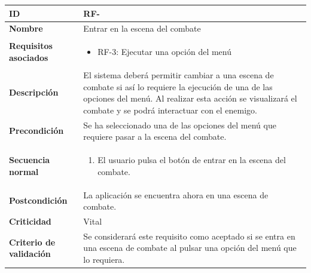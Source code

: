 \begin{center}
	\begin{tabular}{ | p{4.7cm} | p{10cm} | } 
		\hline
		
		\textbf{ID} & RF-\arabic{contador_requisitos_funcionales}
		{contador_requisitos_funcionales} \\
		
		\hline 
		\textbf{Nombre} &
		Entrar en la escena del combate\\ 
		
		\hline
		\textbf{Requisitos asociados} & 
		\begin{itemize}
			\item RF-3: Ejecutar una opción del menú
		\end{itemize}\\
		
		\hline
		\textbf{Descripción} & 
		El sistema deberá permitir cambiar a una escena de combate si así lo requiere la ejecución de una de las opciones del menú. Al realizar esta acción se visualizará el combate y se podrá interactuar con el enemigo.\\
		
		\hline
		\textbf{Precondición} & 
		Se ha seleccionado una de las opciones del menú que requiere pasar a la escena del combate.\\
		
		\hline
		\textbf{Secuencia normal} &
		\begin{enumerate}
			\item El usuario pulsa el botón de entrar en la escena del combate. 
		\end{enumerate}
		\\
		
		\hline
		\textbf{Postcondición} & 
		La aplicación se encuentra ahora en una escena de combate.\\
		
		\hline 
		\textbf{Criticidad} &
		Vital\\
		
		\hline 
		\textbf{Criterio de validación} & 
		Se considerará este requisito como aceptado si se entra en una escena de combate al pulsar una opción del menú que lo requiera.\\
		
		\hline
	\end{tabular}
\end{center}

